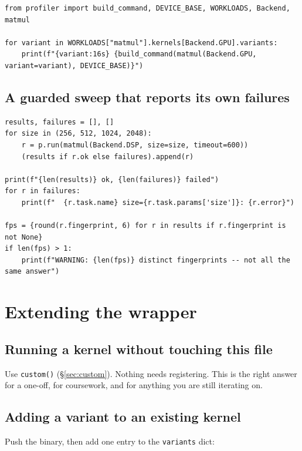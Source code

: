 \documentclass[11pt,a4paper]{article}
\newcommand{\code}[1]{\texttt{\let\_\breakableunderscore #1}}
\newcommand{\breakableunderscore}{\textunderscore\allowbreak}
\begin{document}
\begin{lstlisting}
from profiler import build_command, DEVICE_BASE, WORKLOADS, Backend, matmul

for variant in WORKLOADS["matmul"].kernels[Backend.GPU].variants:
    print(f"{variant:16s} {build_command(matmul(Backend.GPU, variant=variant), DEVICE_BASE)}")
\end{lstlisting}

\subsection{A guarded sweep that reports its own failures}

\begin{lstlisting}
results, failures = [], []
for size in (256, 512, 1024, 2048):
    r = p.run(matmul(Backend.DSP, size=size, timeout=600))
    (results if r.ok else failures).append(r)

print(f"{len(results)} ok, {len(failures)} failed")
for r in failures:
    print(f"  {r.task.name} size={r.task.params['size']}: {r.error}")

fps = {round(r.fingerprint, 6) for r in results if r.fingerprint is not None}
if len(fps) > 1:
    print(f"WARNING: {len(fps)} distinct fingerprints -- not all the same answer")
\end{lstlisting}

\section{Extending the wrapper}

\subsection{Running a kernel without touching this file}

Use \code{custom()} (\S\ref{sec:custom}). Nothing needs registering. This is the
right answer for a one-off, for coursework, and for anything you are still
iterating on.

\subsection{Adding a variant to an existing kernel}

Push the binary, then add one entry to the \code{variants} dict:
\end{document}
